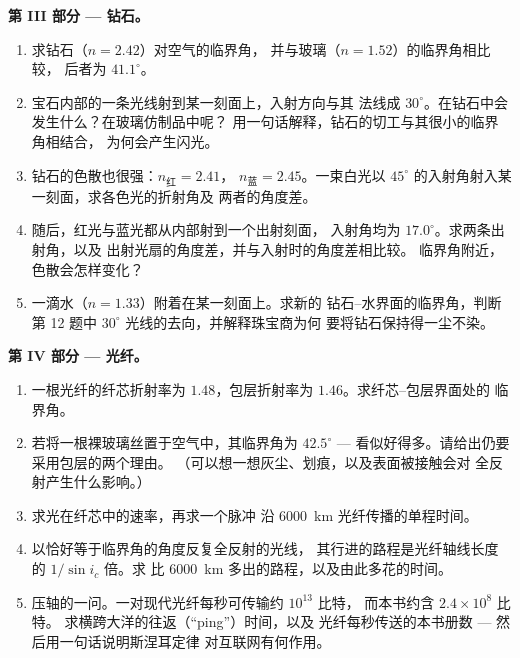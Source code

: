 \begin{problem}
\medskip
 \noindent\textbf{第 III 部分 --- 钻石。}
\begin{enumerate}[resume]
  \item 求钻石（$n = 2.42$）对空气的临界角，
        并与玻璃（$n = 1.52$）的临界角相比较，
        后者为 $41.1^\circ$。
  \item 宝石内部的一条光线射到某一刻面上，入射方向与其
        法线成 $30^\circ$。在钻石中会发生什么？在玻璃仿制品中呢？
        用一句话解释，钻石的切工与其很小的临界角相结合，
        为何会产生闪光。
  \item 钻石的色散也很强：$n_{\text{红}} = 2.41$，
        $n_{\text{蓝}} = 2.45$。一束白光以
        $45^\circ$ 的入射角射入某一刻面，求各色光的折射角及
        两者的角度差。
  \item 随后，红光与蓝光都从内部射到一个出射刻面，
        入射角均为 $17.0^\circ$。求两条出射角，以及
        出射光扇的角度差，并与入射时的角度差相比较。
        临界角附近，色散会怎样变化？
  \item 一滴水（$n = 1.33$）附着在某一刻面上。求新的
        钻石--水界面的临界角，判断
        第 12 题中 $30^\circ$ 光线的去向，并解释珠宝商为何
        要将钻石保持得一尘不染。
\end{enumerate}

\medskip
 \noindent\textbf{第 IV 部分 --- 光纤。}
\begin{enumerate}[resume]
  \item 一根光纤的纤芯折射率为 $1.48$，包层折射率为
        $1.46$。求纤芯--包层界面处的
        临界角。
  \item 若将一根裸玻璃丝置于空气中，其临界角为
        $42.5^\circ$ --- 看似好得多。请给出仍要采用包层的两个理由。
        （可以想一想灰尘、划痕，以及表面被接触会对
        全反射产生什么影响。）
  \item 求光在纤芯中的速率，再求一个脉冲
        沿 \qty{6000}{km} 光纤传播的单程时间。
  \item 以恰好等于临界角的角度反复全反射的光线，
        其行进的路程是光纤轴线长度的 $1/\sin i_c$ 倍。求
        比 \qty{6000}{km} 多出的路程，以及由此多花的时间。
  \item 压轴的一问。一对现代光纤每秒可传输约 $10^{13}$ 比特，
        而本书约含 $2.4 \times 10^8$ 比特。
        求横跨大洋的往返（“ping”）时间，以及
        光纤每秒传送的本书册数 ---
        然后用一句话说明斯涅耳定律
        对互联网有何作用。
\end{enumerate}
\end{problem}
